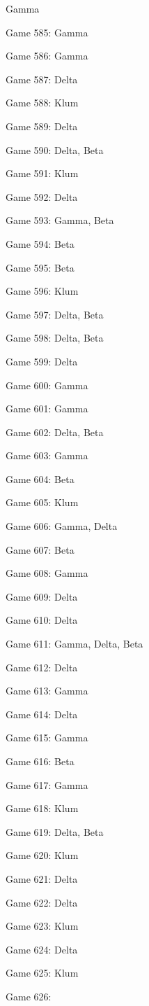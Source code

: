 \documentclass{article}
\begin{document}
\begin{multicols}{3}
\begin{compactitem}
Gamma
\item Game 585:
Gamma
\item Game 586:
Gamma
\item Game 587:
Delta
\item Game 588:
Klum
\item Game 589:
Delta
\item Game 590:
Delta, Beta
\item Game 591:
Klum
\item Game 592:
Delta
\item Game 593:
Gamma, Beta
\item Game 594:
Beta
\item Game 595:
Beta
\item Game 596:
Klum
\item Game 597:
Delta, Beta
\item Game 598:
Delta, Beta
\item Game 599:
Delta
\item Game 600:
Gamma
\item Game 601:
Gamma
\item Game 602:
Delta, Beta
\item Game 603:
Gamma
\item Game 604:
Beta
\item Game 605:
Klum
\item Game 606:
Gamma, Delta
\item Game 607:
Beta
\item Game 608:
Gamma
\item Game 609:
Delta
\item Game 610:
Delta
\item Game 611:
Gamma, Delta, Beta
\item Game 612:
Delta
\item Game 613:
Gamma
\item Game 614:
Delta
\item Game 615:
Gamma
\item Game 616:
Beta
\item Game 617:
Gamma
\item Game 618:
Klum
\item Game 619:
Delta, Beta
\item Game 620:
Klum
\item Game 621:
Delta
\item Game 622:
Delta
\item Game 623:
Klum
\item Game 624:
Delta
\item Game 625:
Klum
\item Game 626:

\end{compactitem}
\end{multicols}
\end{document}
